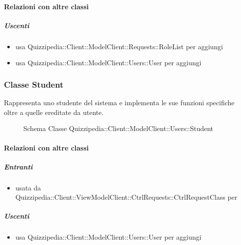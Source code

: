 \paragraph{Relazioni con altre classi}
\subparagraph{Uscenti}
\begin{itemize}
\item usa Quizzipedia::Client::ModelClient::Requests::RoleList per aggiungi
\item usa Quizzipedia::Client::ModelClient::Users::User per aggiungi
\end{itemize}
\subsubsection{Classe Student}
Rappresenta uno studente del sistema e implementa le sue funzioni specifiche oltre a quelle ereditate da utente.
\begin{figure}[H]
\centering
\noindent{}
\caption[Schema Classe Student]{Schema Classe Quizzipedia::Client::ModelClient::Users::Student}
\end{figure}
\paragraph{Relazioni con altre classi}
\subparagraph{Entranti}
\begin{itemize}
\item usata da Quizzipedia::Client::ViewModelClient::CtrlRequests::CtrlRequestClass per 
\end{itemize}
\subparagraph{Uscenti}
\begin{itemize}
\item usa Quizzipedia::Client::ModelClient::Users::User per aggiungi
\end{itemize}
